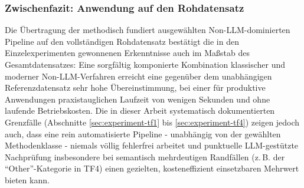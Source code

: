 \subsubsection*{Zwischenfazit: Anwendung auf den Rohdatensatz}

Die Übertragung der methodisch fundiert ausgewählten Non-LLM-dominierten
Pipeline auf den vollständigen Rohdatensatz bestätigt die in den
Einzelexperimenten gewonnenen Erkenntnisse auch im Maßstab des
Gesamtdatensatzes: Eine sorgfältig komponierte Kombination klassischer und
moderner Non-LLM-Verfahren erreicht eine gegenüber dem unabhängigen
Referenzdatensatz sehr hohe Übereinstimmung, bei einer für produktive
Anwendungen praxistauglichen Laufzeit von wenigen Sekunden und ohne laufende
Betriebskosten. Die in dieser Arbeit systematisch dokumentierten Grenzfälle
(Abschnitte \ref{sec:experiment-tf1} bis \ref{sec:experiment-tf4}) zeigen
jedoch auch, dass eine rein automatisierte Pipeline - unabhängig von der
gewählten Methodenklasse - niemals völlig fehlerfrei arbeitet und punktuelle
LLM-gestützte Nachprüfung insbesondere bei semantisch mehrdeutigen
Randfällen (z.\,B. der \enquote{Other}-Kategorie in TF4) einen gezielten,
kosteneffizient einsetzbaren Mehrwert bieten kann.
